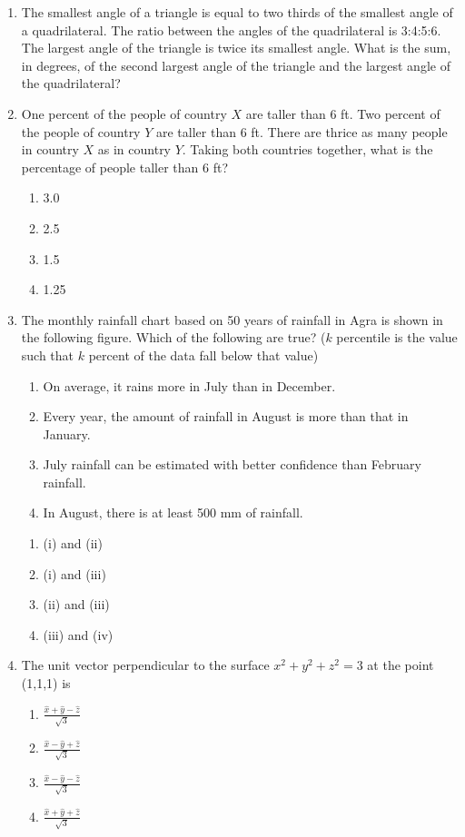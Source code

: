 \documentclass[journal,12pt,onecolumn]{IEEEtran}
\theoremstyle{remark}
\begin{document}
\begin{enumerate}
\item The smallest angle of a triangle is equal to two thirds of the smallest angle of a quadrilateral. The ratio between the angles of the quadrilateral is 3:4:5:6. The largest angle of the triangle is twice its smallest angle. What is the sum, in degrees, of the second largest angle of the triangle and the largest angle of the quadrilateral?

\item One percent of the people of country $X$ are taller than 6 ft. Two percent of the people of country $Y$ are taller than 6 ft. There are thrice as many people in country $X$ as in country $Y$. Taking both countries together, what is the percentage of people taller than 6 ft?
\begin{enumerate}

    \item 3.0
    \item 2.5
    \item 1.5
    \item 1.25
\end{enumerate}

\item The monthly rainfall chart based on 50 years of rainfall in Agra is shown in the following figure. Which of the following are true? ($k$ percentile is the value such that $k$ percent of the data fall below that value)


\pgfplotsset{compat=1.17}






\begin{enumerate}
    \item On average, it rains more in July than in December.
    \item Every year, the amount of rainfall in August is more than that in January.
    \item July rainfall can be estimated with better confidence than February rainfall.
    \item In August, there is at least 500 mm of rainfall.
\end{enumerate}

\begin{enumerate}
    \item (i) and (ii)
    \item (i) and (iii)
    \item (ii) and (iii)
    \item (iii) and (iv)
\end{enumerate}
 \item The unit vector perpendicular to the surface $x^2 + y^2 + z^2 = 3$ at the point (1,1,1) is
        \begin{enumerate}
            \item $\frac{\hat{x} + \hat{y} - \hat{z}}{\sqrt{3}}$
            \item $\frac{\hat{x} - \hat{y} + \hat{z}}{\sqrt{3}}$
            \item $\frac{\hat{x} - \hat{y} - \hat{z}}{\sqrt{3}}$
            \item $\frac{\hat{x} + \hat{y} + \hat{z}}{\sqrt{3}}$
        \end{enumerate}


\end{enumerate}
\end{document}
